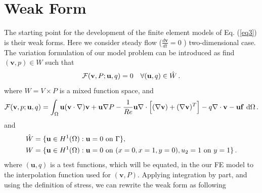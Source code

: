 \documentclass[]{article}
\begin{document}
\section{Weak Form} \label{sec: WF}
The starting point for the development of the finite element models of Eq. (\ref{eq3}) is their weak forms. Here we consider steady flow ($\frac{d \mathbf{v}}{d t} =0$ ) two-dimensional
case.  The variation formulation of our model problem can be introduced as find $(\mathbf{v},p) \in W$ such that
\begin{equation}\label{eq6}
	\begin{aligned}
		\mathcal{F}(\mathbf{v},P;\mathbf{u},q) = 0 \quad \forall (\mathbf{u},q) \in \hat{W}\thinspace.
	\end{aligned}
\end{equation}
where $W= V \times P$ is a mixed function space, and 
\begin{equation}\label{eq7}
	\begin{aligned}
		\mathcal{F}(\mathbf{v},p;\mathbf{u},q) =\int_{\Omega}  \mathbf{u}(\mathbf{v} \cdot \nabla) \mathbf{v} + \mathbf{u} \nabla P -\frac{1}{Re}\mathbf{u} \nabla \cdot \Big[(\nabla \mathbf{v}) + (\nabla \mathbf{v})^T  \Big] - q \nabla \cdot \mathbf{v} - \mathbf{u} \mathbf{f}\ \mathrm{d}\Omega \thinspace .
	\end{aligned}
\end{equation}
and
\begin{equation}\label{eq8}
	\begin{aligned}
		\hat{W} &= \{\mathbf{u} \in H^1(\Omega) : \mathbf{u} = 0 \text{ on } \Gamma\}, \\
		W &= \{\mathbf{u} \in H^1(\Omega) : \mathbf{u} = 0 \text{ on } (x=0,x=1,y=0), u_2 = 1 \text{ on } y=1 \}\thinspace.
	\end{aligned}
\end{equation}
where $(\mathbf{u},q)$ is a test functions, which will be equated, in the our FE model to the interpolation function used for $(\mathbf{v},P)$. Applying integration by part, and using the definition of stress, we can rewrite the weak form as following
\end{document}
